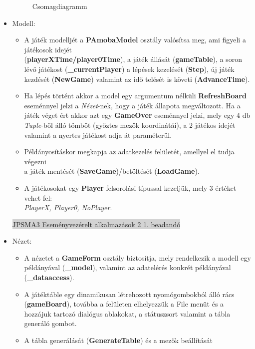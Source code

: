\documentclass[11pt,a4paper]{article}
\begin{document}
\begin{itemize}
\begin{figure}[h]
		\caption{Csomagdiagramm}
	\end{figure}
	\item Modell:
	\begin{itemize}
		\item A játék modelljét a \textbf{PAmobaModel} osztály valósítsa meg, ami figyeli
		a játékosok idejét\\(\textbf{playerXTime/player0Time}), a játék állását
		(\textbf{gameTable}), a soron lévő játékost (\textbf{\_currentPlayer})
		a lépések kezelését (\textbf{Step}), új játék kezdését (\textbf{NewGame})
		valamint az idő telését is követi (\textbf{AdvanceTime}).
		\item Ha lépés történt akkor a model egy argumentum nélküli \textbf{RefreshBoard}
		eseménnyel jelzi a \textit{Nézet}-nek, hogy a játék állapota megváltozott.
		Ha a játék véget ért akkor azt egy \textbf{GameOver} eseménnyel jelzi, mely egy
		4 db \textit{Tuple}-ből álló tömböt (győztes mezők koordinátái), a 2 játékos
		idejét valamint a nyertes játékost adja át paraméterül.
		\item Példányosításkor megkapja az adatkezelés felületét, amellyel el tudja végezni
		\\ a játék mentését (\textbf{SaveGame})/betöltését (\textbf{LoadGame}).
		\item A játékosokat egy \textbf{Player} felsorolási típussal kezeljük, mely
		3 értéket vehet fel:\\ \textit{PlayerX, Player0, NoPlayer}.
	\end{itemize}
	\newpage
	\thispagestyle{empty}
	\begin{center}
	\colorbox{lightgray}{{\large JPSMA3} \hspace{3cm} {\large Eseményvezérelt alkalmazások 2 1. beadandó} \hspace{5cm} \thepage}
	\end{center}
	\item Nézet:
	\begin{itemize}
		\item A nézetet a \textbf{GameForm} osztály biztosítja, mely rendelkezik a modell
		egy példányával (\textbf{\_model}), valamint az adatelérés konkrét példányával
		(\textbf{\_dataaccess}).
		\item A játéktáble egy dinamikusan létrehozott nyomógombokból álló rács
		(\textbf{gameBoard}), továbba a felületen elhelyezzük a File menüt és a hozzájuk
		tartozó dialógus ablakokat, a státuszsort valamint a tábla generáló gombot.
		\item A tábla generálását (\textbf{GenerateTable}) és a mezők beállítását

\end{itemize}
\end{itemize}
\end{document}
